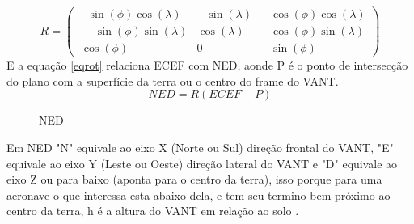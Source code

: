  \begin{equation}
	R=\begin{pmatrix}-\sin \left(\phi \right)\cos \left(\lambda \right)&-\sin \left(\lambda \right)&-\cos \left(\phi \right)\cos \left(\lambda \right)\\ \:-\sin \left(\phi \right)\sin \left(\lambda \right)&\cos \left(\lambda \right)&-\cos \left(\phi \right)\sin \left(\lambda \right)\\ \:\cos \left(\phi \right)&0&-\sin \left(\phi \right)\end{pmatrix}
 	\label{mrot}
 \end{equation}
E a equação \ref{eqrot} relaciona ECEF com NED, aonde P é o ponto de intersecção do plano com a superfície da terra ou o centro do frame do VANT.
 \begin{equation}
 	\label{eqrot}
	NED=R\left(ECEF-P\right)
 \end{equation}
\begin{figure}[H]
	\centering
	\caption{NED}
	
	\label{fig:ned}
\end{figure}

Em NED "N" equivale ao eixo X (Norte ou Sul) direção frontal do VANT, "E" equivale ao eixo Y (Leste ou Oeste) direção lateral do VANT e "D" equivale ao eixo Z ou para baixo (aponta para o centro da terra), isso porque para uma aeronave o que interessa esta abaixo dela, e tem seu termino bem próximo ao centro da terra, h é a altura do VANT em relação ao solo \cite{article1}. 